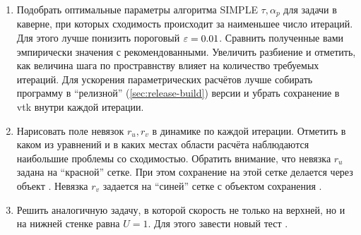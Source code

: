 \begin{enumerate}

\item 
Подобрать оптимальные параметры алгоритма SIMPLE $\tau, \alpha_p$ для задачи в каверне,
при которых сходимость происходит за наименьшее число итераций.
Для этого лучше понизить пороговый $\varepsilon=0.01$.
Сравнить полученные вами эмпирически значения с рекомендованными.
Увеличить разбиение и отметить, как величина шага по простравнству влияет на количество
требуемых итераций.
Для ускорения параметрических расчётов лучше собирать программу в ``релизной'' (\ref{sec:release-build}) 
версии и убрать сохранение в vtk внутри каждой итерации.

\item
Нарисовать поле невязок $r_u, r_v$ в динамике по каждой итерации. Отметить в каком из уравнений и в каких местах области расчёта
наблюдаются наибольшие проблемы со сходимостью.
Обратить внимание, что невязка $r_u$ задана на ``красной'' сетке. При этом сохранение на этой сетке делается
через объект . Невязка $r_v$ задается на ``синей'' сетке с объектом сохранения .

\item
Решить аналогичную задачу, в которой скорость не только на верхней, но и на
нижней стенке равна $U=1$. Для этого завести новый тест .

\end{enumerate}
